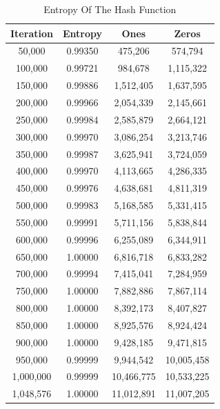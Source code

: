 \documentclass[preprint]{sigplanconf}
\begin{document}
\begin{table} [ht]
    \begin{center}
        \begin{tabular}{|c|c|c|c|}
            \hline
            \textbf{Iteration} & \textbf{Entropy} & \textbf{Ones} & \textbf{Zeros} \\
            \hline
            50,000             & 0.99350          & 475,206       & 574,794        \\
            100,000            & 0.99721          & 984,678       & 1,115,322      \\
            150,000            & 0.99886          & 1,512,405     & 1,637,595      \\
            200,000            & 0.99966          & 2,054,339     & 2,145,661      \\
            250,000            & 0.99984          & 2,585,879     & 2,664,121      \\
            300,000            & 0.99970          & 3,086,254     & 3,213,746      \\
            350,000            & 0.99987          & 3,625,941     & 3,724,059      \\
            400,000            & 0.99970          & 4,113,665     & 4,286,335      \\
            450,000            & 0.99976          & 4,638,681     & 4,811,319      \\
            500,000            & 0.99983          & 5,168,585     & 5,331,415      \\
            550,000            & 0.99991          & 5,711,156     & 5,838,844      \\
            600,000            & 0.99996          & 6,255,089     & 6,344,911      \\
            650,000            & 1.00000          & 6,816,718     & 6,833,282      \\
            700,000            & 0.99994          & 7,415,041     & 7,284,959      \\
            750,000            & 1.00000          & 7,882,886     & 7,867,114      \\
            800,000            & 1.00000          & 8,392,173     & 8,407,827      \\
            850,000            & 1.00000          & 8,925,576     & 8,924,424      \\
            900,000            & 1.00000          & 9,428,185     & 9,471,815      \\
            950,000            & 0.99999          & 9,944,542     & 10,005,458     \\
            1,000,000          & 0.99999          & 10,466,775    & 10,533,225     \\
            1,048,576          & 1.00000          & 11,012,891    & 11,007,205     \\
            \hline
        \end{tabular}
        \caption{Entropy Of The Hash Function}
        \label{table:entropyOfTheHashFunction}
    \end{center}
\end{table}
\end{document}

